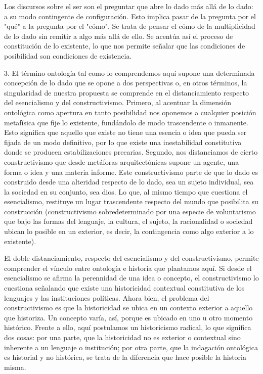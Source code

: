 \documentclass{book}
\begin{document}
Los discursos sobre el ser son el preguntar que abre lo dado más allá de
lo dado: a su modo contingente de configuración. Esto implica pasar de
la pregunta por el "qué" a la pregunta por el "cómo". Se trata de pensar
el cómo de la multiplicidad de lo dado sin remitir a algo más allá de
ello. Se acentúa así el proceso de constitución de lo existente, lo que
nos permite señalar que las condiciones de posibilidad son condiciones
de existencia.

3. El término ontología tal como lo comprendemos aquí supone una
determinada concepción de lo dado que se opone a dos perspectivas o, en
otros términos, la singularidad de nuestra propuesta se comprende en el
distanciamiento respecto del esencialismo y del constructivismo.
Primero, al acentuar la dimensión ontológica como apertura en tanto
posibilidad nos oponemos a cualquier posición metafísica que fije lo
existente, fundándolo de modo trascendente o inmanente. Esto significa
que aquello que existe no tiene una esencia o idea que pueda ser fijada
de un modo definitivo, por lo que existe una inestabilidad constitutiva
donde se producen estabilizaciones precarias. Segundo, nos distanciamos
de cierto constructivismo que desde metáforas arquitectónicas supone un
agente, una forma o idea y una materia informe. Este constructivismo
parte de que lo dado es construido desde una alteridad respecto de lo
dado, sea un sujeto individual, sea la sociedad en su conjunto, sea
dios. Lo que, al mismo tiempo que cuestiona el esencialismo, restituye
un lugar trascendente respecto del mundo que posibilita su construcción
(constructivismo sobredeterminado por una especie de voluntarismo que
bajo las formas del lenguaje, la cultura, el sujeto, la racionalidad o
 sociedad ubican lo posible en un exterior, es decir, la contingencia
como algo exterior a lo existente).

El doble distanciamiento, respecto del esencialismo y del
constructivismo, permite comprender el vínculo entre ontología e
historia que plantamos aquí. Si desde el esencialismo se afirma la
perennidad de una idea o concepto, el constructivismo lo cuestiona
señalando que existe una historicidad contextual constitutiva de los
lenguajes y las instituciones políticas. Ahora bien, el problema del
constructivismo es que la historicidad se ubica en un contexto exterior
a aquello que historiza. Un concepto varía, así, porque es ubicado en
uno u otro momento histórico. Frente a ello, aquí postulamos un
historicismo radical, lo que significa dos cosas: por una parte, que la
historicidad no es exterior o contextual sino inherente a un lenguaje o
institución; por otra parte, que la indagación ontológica es historial y
no histórica, se trata de la diferencia que hace posible la historia
misma.
\end{document}
